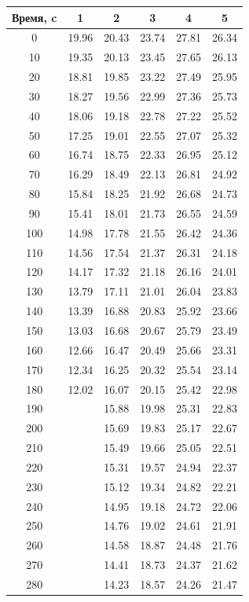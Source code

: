 \documentclass[12pt,a4paper]{article}
\begin{document}
\begin{enumerate}
			\begin{longtable}{|c|c|c|c|c|c|} \hline
Время, c & 1 & 2 & 3 & 4 & 5 \\ \hline	
0 & 19.96 & 20.43 & 23.74 & 27.81 & 26.34 \\ 
10 & 19.35 & 20.13 & 23.45 & 27.65 & 26.13 \\ 
20 & 18.81 & 19.85 & 23.22 & 27.49 & 25.95 \\ 
30 & 18.27 & 19.56 & 22.99 & 27.36 & 25.73 \\ 
40 & 18.06 & 19.18 & 22.78 & 27.22 & 25.52 \\ 
50 & 17.25 & 19.01 & 22.55 & 27.07 & 25.32 \\ 
60 & 16.74 & 18.75 & 22.33 & 26.95 & 25.12 \\ 
70 & 16.29 & 18.49 & 22.13 & 26.81 & 24.92 \\ 
80 & 15.84 & 18.25 & 21.92 & 26.68 & 24.73 \\ 
90 & 15.41 & 18.01 & 21.73 & 26.55 & 24.59 \\ 
100 & 14.98 & 17.78 & 21.55 & 26.42 & 24.36 \\ 
110 & 14.56 & 17.54 & 21.37 & 26.31 & 24.18 \\ 
120 & 14.17 & 17.32 & 21.18 & 26.16 & 24.01 \\ 
130 & 13.79 & 17.11 & 21.01 & 26.04 & 23.83 \\ 
140 & 13.39 & 16.88 & 20.83 & 25.92 & 23.66 \\ 
150 & 13.03 & 16.68 & 20.67 & 25.79 & 23.49 \\ 
160 & 12.66 & 16.47 & 20.49 & 25.66 & 23.31 \\ 
170 & 12.34 & 16.25 & 20.32 & 25.54 & 23.14 \\ 
180 & 12.02 & 16.07 & 20.15 & 25.42 & 22.98 \\ 
190 &  & 15.88 & 19.98 & 25.31 & 22.83 \\ 
200 &  & 15.69 & 19.83 & 25.17 & 22.67 \\ 
210 &  & 15.49 & 19.66 & 25.05 & 22.51 \\ 
220 &  & 15.31 & 19.57 & 24.94 & 22.37 \\ 
230 &  & 15.12 & 19.34 & 24.82 & 22.21 \\ 
240 &  & 14.95 & 19.18 & 24.72 & 22.06 \\ 
250 &  & 14.76 & 19.02 & 24.61 & 21.91 \\ 
260 &  & 14.58 & 18.87 & 24.48 & 21.76 \\ 
270 &  & 14.41 & 18.73 & 24.37 & 21.62 \\ 
280 &  & 14.23 & 18.57 & 24.26 & 21.47 \\ 

\end{longtable}
\end{enumerate}
\end{document}
